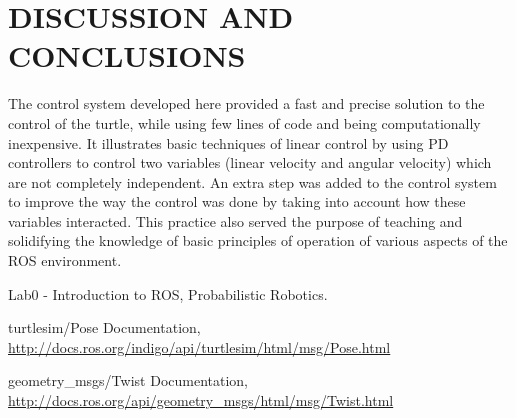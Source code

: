 \documentclass[a4paper, 10pt, conference]{ieeeconf}
\begin{document}
\section{DISCUSSION AND CONCLUSIONS}

The control system developed here provided a fast and precise solution to the control of the turtle, while using few lines of code and being computationally inexpensive. It illustrates basic techniques of linear control by using PD controllers to control two variables (linear velocity and angular velocity) which are not completely independent. An extra step was added to the control system to improve the way the control was done by taking into account how these variables interacted. This practice also served the purpose of teaching and solidifying the knowledge of basic principles of operation of various aspects of the ROS environment.




\begin{thebibliography}{99}

Lab0 - Introduction to ROS, Probabilistic Robotics.

turtlesim/Pose Documentation, \url{http://docs.ros.org/indigo/api/turtlesim/html/msg/Pose.html}

geometry\_msgs/Twist Documentation, \url{http://docs.ros.org/api/geometry_msgs/html/msg/Twist.html}


\end{thebibliography}
\end{document}
